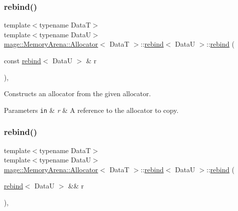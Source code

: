 \subsubsection{\texorpdfstring{rebind()}{rebind()}\hspace{0.1cm}{\footnotesize\ttfamily [2/3]}}
{\footnotesize\ttfamily template$<$typename DataT$>$ \\
template$<$typename DataU$>$ \\
\hyperlink{structmage_1_1_memory_arena_1_1_allocator}{mage\+::\+Memory\+Arena\+::\+Allocator}$<$ DataT $>$\+::\hyperlink{structmage_1_1_memory_arena_1_1_allocator_1_1rebind}{rebind}$<$ DataU $>$\+::\hyperlink{structmage_1_1_memory_arena_1_1_allocator_1_1rebind}{rebind} (\begin{DoxyParamCaption}\item[{const \hyperlink{structmage_1_1_memory_arena_1_1_allocator_1_1rebind}{rebind}$<$ DataU $>$ \&}]{r }\end{DoxyParamCaption})\hspace{0.3cm}{\ttfamily [private]}, {\ttfamily [delete]}}

Constructs an allocator from the given allocator.


\begin{DoxyParams}[1]{Parameters}
\mbox{\tt in}  & {\em r} & A reference to the allocator to copy. \\
\hline
\end{DoxyParams}
\hypertarget{structmage_1_1_memory_arena_1_1_allocator_1_1rebind_ad5ffaeaa7cb232ecab88501d9913f9b7}{}\label{structmage_1_1_memory_arena_1_1_allocator_1_1rebind_ad5ffaeaa7cb232ecab88501d9913f9b7} 
\subsubsection{\texorpdfstring{rebind()}{rebind()}\hspace{0.1cm}{\footnotesize\ttfamily [3/3]}}
{\footnotesize\ttfamily template$<$typename DataT$>$ \\
template$<$typename DataU$>$ \\
\hyperlink{structmage_1_1_memory_arena_1_1_allocator}{mage\+::\+Memory\+Arena\+::\+Allocator}$<$ DataT $>$\+::\hyperlink{structmage_1_1_memory_arena_1_1_allocator_1_1rebind}{rebind}$<$ DataU $>$\+::\hyperlink{structmage_1_1_memory_arena_1_1_allocator_1_1rebind}{rebind} (\begin{DoxyParamCaption}\item[{\hyperlink{structmage_1_1_memory_arena_1_1_allocator_1_1rebind}{rebind}$<$ DataU $>$ \&\&}]{r }\end{DoxyParamCaption})\hspace{0.3cm}{\ttfamily [private]}, {\ttfamily [delete]}}

